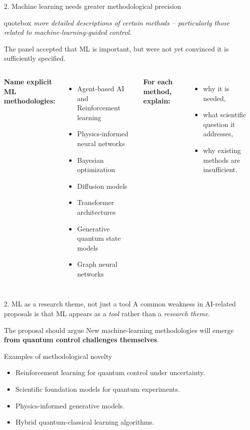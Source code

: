 \documentclass[10pt,aspectratio=169]{beamer}
\newcommand{\reviewerquote}[1]{%
  \begin{beamercolorbox}[sep=6pt,rounded=true,shadow=true]{quotebox}%
  \itshape #1%
  \end{beamercolorbox}%
}
\begin{document}
\begin{frame}{2. Machine learning needs greater methodological precision}
  \reviewerquote{more detailed descriptions of certain methods -- particularly those related to machine-learning-guided control.}
  \vfill
  The panel accepted that ML is important, but were not yet convinced it is sufficiently specified.
  \vfill
  \begin{columns}[T]
    \textbf{Name explicit ML methodologies:}
    \begin{itemize}\small
      \item Agent-based AI and Reinforcement learning
      \item Physics-informed neural networks
      \item Bayesian optimization
      \item Diffusion models
      \item Transformer architectures
      \item Generative quantum state models
      \item Graph neural networks
    \end{itemize}

    \textbf{For each method, explain:}
    \begin{itemize}\small
      \item why it is needed,
      \item what scientific question it addresses,
      \item why existing methods are insufficient.
    \end{itemize}
  \end{columns}
\end{frame}

\begin{frame}{2. ML as a research theme, not just a tool}
  A common weakness in AI-related proposals is that ML appears as a \emph{tool} rather than a
  \emph{research theme}.
  \vfill
  \begin{block}{The proposal should argue}
    New machine-learning methodologies will emerge \textbf{from quantum control challenges themselves}.
  \end{block}
  \vfill
  \begin{block}{Examples of methodological novelty}
    \begin{itemize}
      \item Reinforcement learning for quantum control under uncertainty.
      \item Scientific foundation models for quantum experiments.
      \item Physics-informed generative models.
      \item Hybrid quantum-classical learning algorithms.
    \end{itemize}
  \end{block}
\end{frame}
\end{document}
